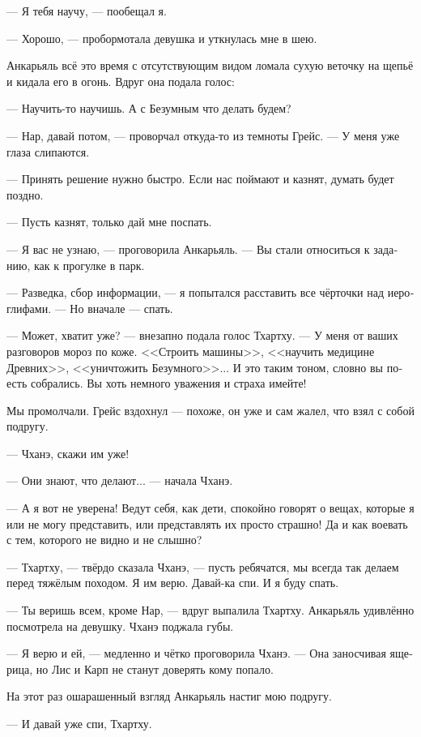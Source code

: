 \documentclass[a4paper,12pt,fleqn]{book}\usepackage{cooltooltips}\usepackage{polyglossia}\setdefaultlanguage[babelshorthands=true]{russian}\setotherlanguage{english}\defaultfontfeatures{Ligatures=TeX,Mapping=tex-text} \usepackage{xcolor}\definecolor{lightgray}{HTML}{bbbbbb}\color{lightgray}\newcommand{\ml}[3]{\textenglish{\textcolor{black}{#3}}}
\begin{document}
{--- Я тебя научу, --- пообещал я.

--- Хорошо, --- пробормотала девушка и уткнулась мне в шею.

Анкарьяль всё это время с отсутствующим видом ломала сухую веточку на щепьё и кидала его в огонь.
Вдруг она подала голос:

--- Научить-то научишь.
А с Безумным что делать будем?

--- Нар, давай потом, --- проворчал откуда-то из темноты Грейс.
--- У меня уже глаза слипаются.

--- Принять решение нужно быстро.
Если нас поймают и казнят, думать будет поздно.

--- Пусть казнят, только дай мне поспать.

--- Я вас не узнаю, --- проговорила Анкарьяль.
--- Вы стали относиться к заданию, как к прогулке в парк.

--- Разведка, сбор информации, --- я попытался расставить все чёрточки над иероглифами.
--- Но вначале --- спать.

--- Может, хватит уже? --- внезапно подала голос Тхартху.
--- У меня от ваших разговоров мороз по коже.
<<Строить машины>>, <<научить медицине Древних>>, <<уничтожить Безумного>>...
И это таким тоном, словно вы поесть собрались.
Вы хоть немного уважения и страха имейте!

Мы промолчали.
Грейс вздохнул --- похоже, он уже и сам жалел, что взял с собой подругу.

--- Чханэ, скажи им уже!

--- Они знают, что делают... --- начала Чханэ.

--- А я вот не уверена!
Ведут себя, как дети, спокойно говорят о вещах, которые я или не могу представить, или представлять их просто страшно!
Да и как воевать с тем, которого не видно и не слышно?

--- Тхартху, --- твёрдо сказала Чханэ, --- пусть ребячатся, мы всегда так делаем перед тяжёлым походом.
Я им верю.
Давай-ка спи.
И я буду спать.

--- Ты веришь всем, кроме Нар, --- вдруг выпалила Тхартху.
Анкарьяль удивлённо посмотрела на девушку.
Чханэ поджала губы.

--- Я верю и ей, --- медленно и чётко проговорила Чханэ.
--- Она заносчивая ящерица, но Лис и Карп не станут доверять кому попало.

На этот раз ошарашенный взгляд Анкарьяль настиг мою подругу.

--- И давай уже спи, Тхартху.

}
\end{document}
